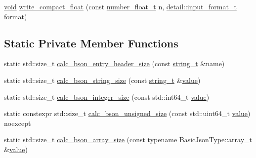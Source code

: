 \begin{DoxyCompactItemize}
\item 
\hyperlink{namespacenlohmann_1_1detail_a59fca69799f6b9e366710cb9043aa77d}{void} \hyperlink{classnlohmann_1_1detail_1_1binary__writer_ae69dc3c5b2e8c1c8e461779cddb87436}{write\+\_\+compact\+\_\+float} (const \hyperlink{classnlohmann_1_1detail_1_1binary__writer_abb4b7c621d0cb7633b5806c603f3c51a}{number\+\_\+float\+\_\+t} n, \hyperlink{namespacenlohmann_1_1detail_aa554fc6a11519e4f347deb25a9f0db40}{detail\+::input\+\_\+format\+\_\+t} format)
\end{DoxyCompactItemize}
\subsection*{Static Private Member Functions}
\begin{DoxyCompactItemize}
\item 
static std\+::size\+\_\+t \hyperlink{classnlohmann_1_1detail_1_1binary__writer_a5bae2f1db2c511b869dffaddf15a1653}{calc\+\_\+bson\+\_\+entry\+\_\+header\+\_\+size} (const \hyperlink{classnlohmann_1_1detail_1_1binary__writer_a29f2ae7a5c4a8c1dae47b3b2310de8a8}{string\+\_\+t} \&name)
\item 
static std\+::size\+\_\+t \hyperlink{classnlohmann_1_1detail_1_1binary__writer_aea44fd97a5cb9b4f175e66e3e4fdf158}{calc\+\_\+bson\+\_\+string\+\_\+size} (const \hyperlink{classnlohmann_1_1detail_1_1binary__writer_a29f2ae7a5c4a8c1dae47b3b2310de8a8}{string\+\_\+t} \&\hyperlink{namespacenlohmann_1_1detail_a2fb6dae6578e06ae73ca0d7cc8512b1aa2063c1608d6e0baf80249c42e2be5804}{value})
\item 
static std\+::size\+\_\+t \hyperlink{classnlohmann_1_1detail_1_1binary__writer_aeab70c895931b96ea598306b37eca271}{calc\+\_\+bson\+\_\+integer\+\_\+size} (const std\+::int64\+\_\+t \hyperlink{namespacenlohmann_1_1detail_a2fb6dae6578e06ae73ca0d7cc8512b1aa2063c1608d6e0baf80249c42e2be5804}{value})
\item 
static constexpr std\+::size\+\_\+t \hyperlink{classnlohmann_1_1detail_1_1binary__writer_aa1d6bb9f3af16f07ce2440c354b5787b}{calc\+\_\+bson\+\_\+unsigned\+\_\+size} (const std\+::uint64\+\_\+t \hyperlink{namespacenlohmann_1_1detail_a2fb6dae6578e06ae73ca0d7cc8512b1aa2063c1608d6e0baf80249c42e2be5804}{value}) noexcept
\item 
static std\+::size\+\_\+t \hyperlink{classnlohmann_1_1detail_1_1binary__writer_af08f9302a02516ff8cf358a99aaa1ddf}{calc\+\_\+bson\+\_\+array\+\_\+size} (const typename Basic\+Json\+Type\+::array\+\_\+t \&\hyperlink{namespacenlohmann_1_1detail_a2fb6dae6578e06ae73ca0d7cc8512b1aa2063c1608d6e0baf80249c42e2be5804}{value})

\end{DoxyCompactItemize}

